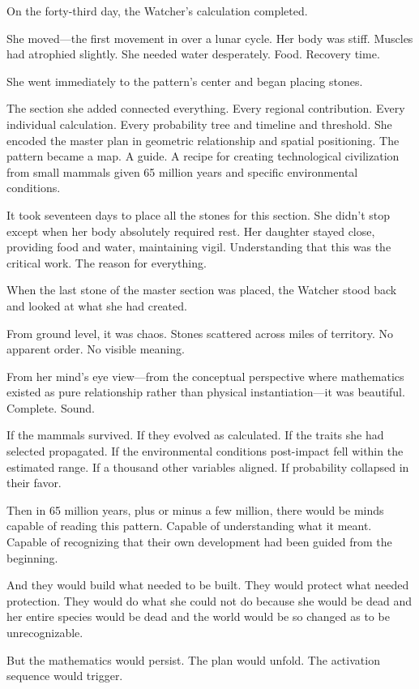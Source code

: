 On the forty-third day, the Watcher's calculation completed.

She moved—the first movement in over a lunar cycle. Her body was stiff. Muscles had atrophied slightly. She needed water desperately. Food. Recovery time.

She went immediately to the pattern's center and began placing stones.

The section she added connected everything. Every regional contribution. Every individual calculation. Every probability tree and timeline and threshold. She encoded the master plan in geometric relationship and spatial positioning. The pattern became a map. A guide. A recipe for creating technological civilization from small mammals given 65 million years and specific environmental conditions.

It took seventeen days to place all the stones for this section. She didn't stop except when her body absolutely required rest. Her daughter stayed close, providing food and water, maintaining vigil. Understanding that this was the critical work. The reason for everything.

When the last stone of the master section was placed, the Watcher stood back and looked at what she had created.

From ground level, it was chaos. Stones scattered across miles of territory. No apparent order. No visible meaning.

From her mind's eye view—from the conceptual perspective where mathematics existed as pure relationship rather than physical instantiation—it was beautiful. Complete. Sound.

If the mammals survived. If they evolved as calculated. If the traits she had selected propagated. If the environmental conditions post-impact fell within the estimated range. If a thousand other variables aligned. If probability collapsed in their favor.

Then in 65 million years, plus or minus a few million, there would be minds capable of reading this pattern. Capable of understanding what it meant. Capable of recognizing that their own development had been guided from the beginning.

And they would build what needed to be built. They would protect what needed protection. They would do what she could not do because she would be dead and her entire species would be dead and the world would be so changed as to be unrecognizable.

But the mathematics would persist. The plan would unfold. The activation sequence would trigger.

